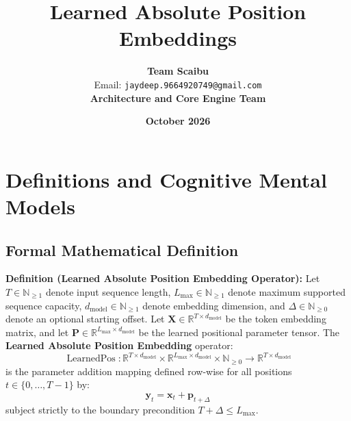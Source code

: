 \documentclass[11pt,a4paper]{article}
\title{\textbf{Learned Absolute Position Embeddings}}
\author{\textbf{Team Scaibu} \\ \small Email: \texttt{jaydeep.9664920749@gmail.com} \\ \small \textbf{Architecture and Core Engine Team}}
\date{\textbf{October 2026}}
\theoremstyle{definition}
\begin{document}
\maketitle

\section{Definitions and Cognitive Mental Models}

\subsection{Formal Mathematical Definition}
\textbf{Definition (Learned Absolute Position Embedding Operator):}
Let $T \in \mathbb{N}_{\ge 1}$ denote input sequence length, $L_{\text{max}} \in \mathbb{N}_{\ge 1}$ denote maximum supported sequence capacity, $d_{\text{model}} \in \mathbb{N}_{\ge 1}$ denote embedding dimension, and $\Delta \in \mathbb{N}_{\ge 0}$ denote an optional starting offset.
Let $\mathbf{X} \in \mathbb{R}^{T \times d_{\text{model}}}$ be the token embedding matrix, and let $\mathbf{P} \in \mathbb{R}^{L_{\text{max}} \times d_{\text{model}}}$ be the learned positional parameter tensor.
The \textbf{Learned Absolute Position Embedding} operator:
{\boldmath
\begin{equation}
\operatorname{LearnedPos}: \mathbb{R}^{T \times d_{\text{model}}} \times \mathbb{R}^{L_{\text{max}} \times d_{\text{model}}} \times \mathbb{N}_{\ge 0} \longrightarrow \mathbb{R}^{T \times d_{\text{model}}}
\end{equation}
}
is the parameter addition mapping defined row-wise for all positions $t \in \{0, \dots, T-1\}$ by:
{\boldmath
\begin{equation}
\mathbf{y}_t = \mathbf{x}_t + \mathbf{p}_{t + \Delta}
\end{equation}
}
subject strictly to the boundary precondition $T + \Delta \le L_{\text{max}}$.
\end{document}

